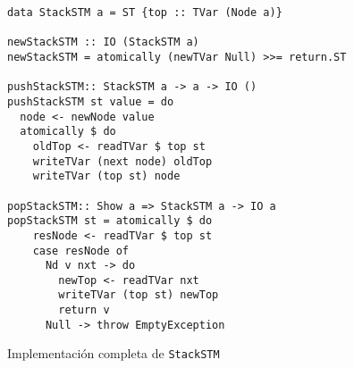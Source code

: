 \begin{figure}[H]
\begin{verbatim}
data StackSTM a = ST {top :: TVar (Node a)}

newStackSTM :: IO (StackSTM a)
newStackSTM = atomically (newTVar Null) >>= return.ST

pushStackSTM:: StackSTM a -> a -> IO ()
pushStackSTM st value = do
  node <- newNode value
  atomically $ do
    oldTop <- readTVar $ top st
    writeTVar (next node) oldTop
    writeTVar (top st) node

popStackSTM:: Show a => StackSTM a -> IO a
popStackSTM st = atomically $ do
    resNode <- readTVar $ top st
    case resNode of
      Nd v nxt -> do
        newTop <- readTVar nxt
        writeTVar (top st) newTop
        return v
      Null -> throw EmptyException   
\end{verbatim}
\caption{Implementación completa de \texttt{StackSTM}}
\end{figure}